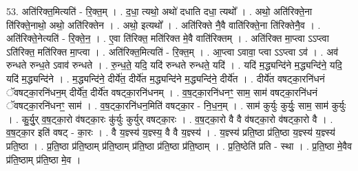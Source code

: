 \documentclass[17pt]{extarticle}
\begin{document}
53. अति॑रिक्त॒मित्यति॑ - रि॒क्त॒म् । . द॒धा॒ त्यथो॒ अथो॑ दधाति दधा॒ त्यथो᳚ । . अथो॒ अति॑रिक्ते॒ना ति॑रिक्ते॒नाथो॒ अथो॒ अति॑रिक्तेन । . अथो॒ इत्यथो᳚ । . अति॑रिक्ते नै॒वै वाति॑रिक्ते॒ना ति॑रिक्तेनै॒व । . अति॑रिक्ते॒नेत्यति॑ - रि॒क्ते॒न॒ । . ए॒वा ति॑रिक्त॒ मति॑रिक्त मे॒वै वाति॑रिक्तम् । . अति॑रिक्त मा॒प्त्वा ऽऽप्त्वा ऽति॑रिक्त॒ मति॑रिक्त मा॒प्त्वा । . अति॑रिक्त॒मित्यति॑ - रि॒क्त॒म् । . आ॒प्त्वा ऽवावा॒ प्त्वा ऽऽप्त्वा ऽव॑ । . अव॑ रुन्धते रुन्ध॒ते ऽवाव॑ रुन्धते । . रु॒न्ध॒ते॒ यदि॒ यदि॑ रुन्धते रुन्धते॒ यदि॑ । . यदि॑ म॒द्ध्यन्दि॑ने म॒द्ध्यन्दि॑ने॒ यदि॒ यदि॑ म॒द्ध्यन्दि॑ने । . म॒द्ध्यन्दि॑ने॒ दीर्ये॑त॒ दीर्ये॑त म॒द्ध्यन्दि॑ने म॒द्ध्यन्दि॑ने॒ दीर्ये॑त । . दीर्ये॑त वषट्का॒रनि॑धनं ॅवषट्का॒रनि॑धन॒म् दीर्ये॑त॒ दीर्ये॑त वषट्का॒रनि॑धनम् । . व॒ष॒ट्का॒रनि॑धनꣳ॒॒ साम॒ साम॑ वषट्का॒रनि॑धनं ॅवषट्का॒रनि॑धनꣳ॒॒ साम॑ । . व॒ष॒ट्का॒रनि॑धन॒मिति॑ वषट्का॒र - नि॒ध॒न॒म् । . साम॑ कुर्युः कुर्युः॒ साम॒ साम॑ कुर्युः । . कु॒र्यु॒र् व॒ष॒ट्का॒रो व॑षट्का॒रः कु॑र्युः कुर्युर् वषट्का॒रः । . व॒ष॒ट्का॒रो वै वै व॑षट्का॒रो व॑षट्का॒रो वै । . व॒ष॒ट्का॒र इति॑ वषट् - का॒रः । . वै य॒ज्ञ्स्य॑ य॒ज्ञ्स्य॒ वै वै य॒ज्ञ्स्य॑ । . य॒ज्ञ्स्य॑ प्रति॒ष्ठा प्र॑ति॒ष्ठा य॒ज्ञ्स्य॑ य॒ज्ञ्स्य॑ प्रति॒ष्ठा । . प्र॒ति॒ष्ठा प्र॑ति॒ष्ठाम् प्र॑ति॒ष्ठाम् प्र॑ति॒ष्ठा प्र॑ति॒ष्ठा प्र॑ति॒ष्ठाम् । . प्र॒ति॒ष्ठेति॑ प्रति - स्था । . प्र॒ति॒ष्ठा मे॒वैव प्र॑ति॒ष्ठाम् प्र॑ति॒ष्ठा मे॒व । \newline
\end{document}
